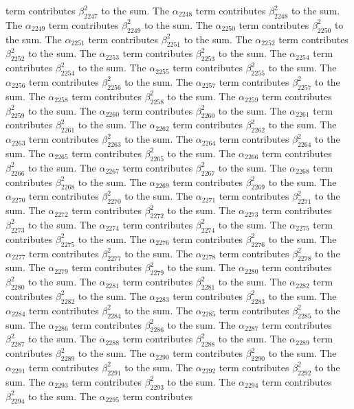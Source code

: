 \begin{lemma}
term contributes $\beta_{2247}^{2}$ to the sum. The $\alpha_{2248}$ term contributes $\beta_{2248}^{2}$ to the sum. The $\alpha_{2249}$ term contributes $\beta_{2249}^{2}$ to the sum. The $\alpha_{2250}$ term contributes $\beta_{2250}^{2}$ to the sum. The $\alpha_{2251}$ term contributes $\beta_{2251}^{2}$ to the sum. The $\alpha_{2252}$ term contributes $\beta_{2252}^{2}$ to the sum. The $\alpha_{2253}$ term contributes $\beta_{2253}^{2}$ to the sum. The $\alpha_{2254}$ term contributes $\beta_{2254}^{2}$ to the sum. The $\alpha_{2255}$ term contributes $\beta_{2255}^{2}$ to the sum. The $\alpha_{2256}$ term contributes $\beta_{2256}^{2}$ to the sum. The $\alpha_{2257}$ term contributes $\beta_{2257}^{2}$ to the sum. The $\alpha_{2258}$ term contributes $\beta_{2258}^{2}$ to the sum. The $\alpha_{2259}$ term contributes $\beta_{2259}^{2}$ to the sum. The $\alpha_{2260}$ term contributes $\beta_{2260}^{2}$ to the sum. The $\alpha_{2261}$ term contributes $\beta_{2261}^{2}$ to the sum. The $\alpha_{2262}$ term contributes $\beta_{2262}^{2}$ to the sum. The $\alpha_{2263}$ term contributes $\beta_{2263}^{2}$ to the sum. The $\alpha_{2264}$ term contributes $\beta_{2264}^{2}$ to the sum. The $\alpha_{2265}$ term contributes $\beta_{2265}^{2}$ to the sum. The $\alpha_{2266}$ term contributes $\beta_{2266}^{2}$ to the sum. The $\alpha_{2267}$ term contributes $\beta_{2267}^{2}$ to the sum. The $\alpha_{2268}$ term contributes $\beta_{2268}^{2}$ to the sum. The $\alpha_{2269}$ term contributes $\beta_{2269}^{2}$ to the sum. The $\alpha_{2270}$ term contributes $\beta_{2270}^{2}$ to the sum. The $\alpha_{2271}$ term contributes $\beta_{2271}^{2}$ to the sum. The $\alpha_{2272}$ term contributes $\beta_{2272}^{2}$ to the sum. The $\alpha_{2273}$ term contributes $\beta_{2273}^{2}$ to the sum. The $\alpha_{2274}$ term contributes $\beta_{2274}^{2}$ to the sum. The $\alpha_{2275}$ term contributes $\beta_{2275}^{2}$ to the sum. The $\alpha_{2276}$ term contributes $\beta_{2276}^{2}$ to the sum. The $\alpha_{2277}$ term contributes $\beta_{2277}^{2}$ to the sum. The $\alpha_{2278}$ term contributes $\beta_{2278}^{2}$ to the sum. The $\alpha_{2279}$ term contributes $\beta_{2279}^{2}$ to the sum. The $\alpha_{2280}$ term contributes $\beta_{2280}^{2}$ to the sum. The $\alpha_{2281}$ term contributes $\beta_{2281}^{2}$ to the sum. The $\alpha_{2282}$ term contributes $\beta_{2282}^{2}$ to the sum. The $\alpha_{2283}$ term contributes $\beta_{2283}^{2}$ to the sum. The $\alpha_{2284}$ term contributes $\beta_{2284}^{2}$ to the sum. The $\alpha_{2285}$ term contributes $\beta_{2285}^{2}$ to the sum. The $\alpha_{2286}$ term contributes $\beta_{2286}^{2}$ to the sum. The $\alpha_{2287}$ term contributes $\beta_{2287}^{2}$ to the sum. The $\alpha_{2288}$ term contributes $\beta_{2288}^{2}$ to the sum. The $\alpha_{2289}$ term contributes $\beta_{2289}^{2}$ to the sum. The $\alpha_{2290}$ term contributes $\beta_{2290}^{2}$ to the sum. The $\alpha_{2291}$ term contributes $\beta_{2291}^{2}$ to the sum. The $\alpha_{2292}$ term contributes $\beta_{2292}^{2}$ to the sum. The $\alpha_{2293}$ term contributes $\beta_{2293}^{2}$ to the sum. The $\alpha_{2294}$ term contributes $\beta_{2294}^{2}$ to the sum. The $\alpha_{2295}$ term contributes 
\end{lemma}
